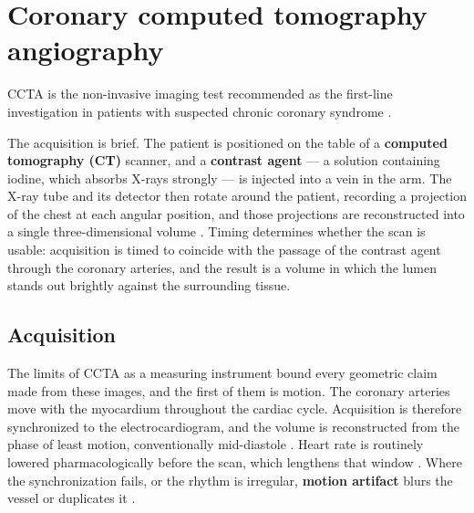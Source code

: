 %

\section{Coronary computed tomography angiography}
\label{sec:ccta}

CCTA is the non-invasive imaging test recommended as the first-line investigation in patients with
suspected chronic coronary syndrome \cite{knuuti2019esc}.

The acquisition is brief.
The patient is positioned on the table of a \textbf{computed tomography (CT)} scanner, and a
\textbf{contrast agent} --- a solution containing iodine, which absorbs X-rays strongly --- is
injected into a vein in the arm.
The X-ray tube and its detector then rotate around the patient, recording a projection of the chest
at each angular position, and those projections are reconstructed into a single three-dimensional
volume \cite{abbara2016scct}.
Timing determines whether the scan is usable: acquisition is timed to coincide with the passage of
the contrast agent through the coronary arteries, and the result is a volume in which the lumen
stands out brightly against the surrounding tissue.

\subsection{Acquisition}

The limits of CCTA as a measuring instrument bound every geometric claim made from these images, and
the first of them is motion.
The coronary arteries move with the myocardium throughout the cardiac cycle.
Acquisition is therefore synchronized to the electrocardiogram, and the volume is reconstructed from
the phase of least motion, conventionally mid-diastole \cite{abbara2016scct}.
Heart rate is routinely lowered pharmacologically before the scan, which lengthens that window
\cite{abbara2016scct}.
Where the synchronization fails, or the rhythm is irregular, \textbf{motion artifact} blurs the
vessel or duplicates it \cite{abbara2016scct}.


